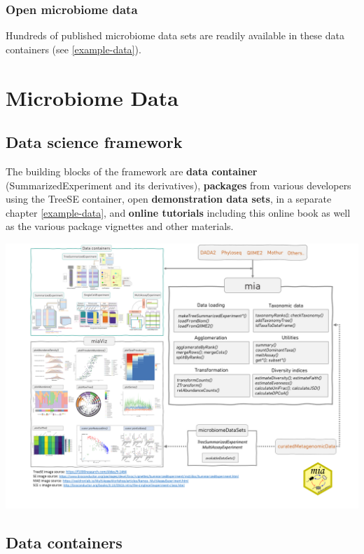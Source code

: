 \documentclass[
]{book}
\begin{document}
\hypertarget{open-microbiome-data}{%
\subsection{Open microbiome data}\label{open-microbiome-data}}

Hundreds of published microbiome data sets are readily available in
these data containers (see \ref{example-data}).

\hypertarget{containers}{%
\chapter{Microbiome Data}\label{containers}}

\hypertarget{data-science-framework}{%
\section{Data science framework}\label{data-science-framework}}

The building blocks of the framework are \textbf{data container}
(SummarizedExperiment and its derivatives), \textbf{packages} from various
developers using the TreeSE container, open \textbf{demonstration data
sets}, in a separate chapter \ref{example-data}, and \textbf{online
tutorials} including this online book as well as the various package
vignettes and other materials.

\includegraphics[width=18.67in]{general/figures/FigureOverviewV2_mod}

\hypertarget{data-containers}{%
\section{Data containers}\label{data-containers}}
\end{document}
